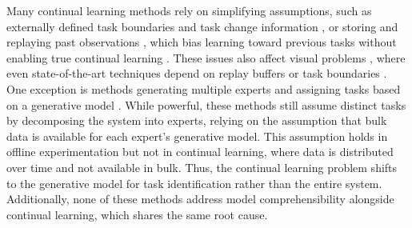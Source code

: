 Many continual learning methods rely on simplifying assumptions, such as externally defined task boundaries and task change information \cite{rusu2016progressive, jacobson2022task}, or storing and replaying past observations \cite{buzzega2020dark}, which bias learning toward previous tasks without enabling true continual learning \cite{kirkpatrick2017overcoming}. These issues also affect visual problems \cite{qu2021recent}, where even state-of-the-art techniques depend on replay buffers \cite{galashov2023continually} or task boundaries \cite{wang2022continual}. One exception is methods generating multiple experts and assigning tasks based on a generative model \cite{erden2024directed, lee2020neural}. While powerful, these methods still assume distinct tasks by decomposing the system into experts, relying on the assumption that bulk data is available for each expert’s generative model. This assumption holds in offline experimentation but not in continual learning, where data is distributed over time and not available in bulk. Thus, the continual learning problem shifts to the generative model for task identification rather than the entire system. Additionally, none of these methods address model comprehensibility alongside continual learning, which shares the same root cause.







